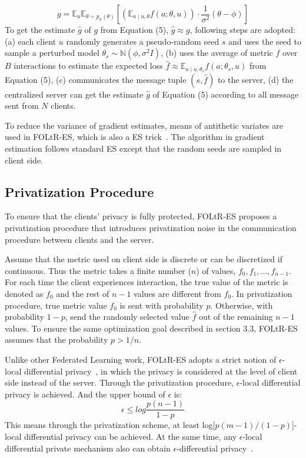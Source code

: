 \begin{equation}
	g=\mathbb{E}_{u} \mathbb{E}_{\theta \sim p_{\phi}(\theta)}\left[\left(\mathbb{E}_{a \mid u, \theta} f(a ; \theta, u)\right) \cdot \frac{1}{\sigma^{2}}(\theta-\phi)\right]
\end{equation}
To get the estimate $\hat{g}$ of $g$ from Equation (5), $\hat{g} \approx g$, following steps are adopted: (a) each client $u$ randomly generates a pseudo-random seed $s$ and uses the seed to sample a perturbed model $\theta_{s} \sim \mathbb{N}\left(\phi, \sigma^{2} I\right)$, (b) uses the average of metric $f$ over $B$ interactions to estimate the expected loss $\hat{f} \approx \mathbb{E}_{a \mid u, \theta_{s}} f(a;\theta_s, u) $ from Equation (5), (c) communicates the message tuple $(s,\hat{f})$ to the server, (d) the centralized server can get the estimate $\hat{g}$ of Equation (5) according to all message sent from $N$ clients.

To reduce the variance of gradient estimates, means of antithetic variates are used in FOLtR-ES, which is also a ES trick~\cite{salimans2017evolution}. The algorithm in gradient estimation follows standard ES except that the random seeds are sampled in client side.

\subsection{Privatization Procedure}
To ensure that the clients' privacy is fully protected, FOLtR-ES proposes a privatization procedure that introduces privatization noise in the communication procedure  between clients and the server.

Assume that the metric used on client side is discrete or can be discretized if continuous. Thus the metric takes a finite number ($n$) of values, $f_0, f_1, ..., f_{n-1}$. For each time the client experiences interaction, the true value of the metric is denoted as $f_0$ and the rest of $n-1$ values are different from $f_0$. In privatization procedure, true metric value $f_0$ is sent with probability $p$. Otherwise, with probability $1-p$, send the randomly selected value $\hat{f}$ out of the remaining $n-1$ values. To ensure the same optimization goal described in section 3.3, FOLtR-ES assumes that the probability $p > 1/n$.

Unlike other Federated Learning work, FOLtR-ES adopts a strict notion of $\epsilon$-local differential privacy~\cite{}, in which the privacy is considered at the level of client side instead of the server. Through the privatization procedure, $\epsilon$-local differential privacy is achieved. And the upper bound of $\epsilon$ is:
\begin{equation}
	\epsilon \leq log\frac{p(n-1)}{1-p} 
\end{equation}
This means through the privatization scheme, at least log[$p(m-1)/(1-p)$]-local differential privacy can be achieved. At the same time, any $\epsilon$-local differential private mechanism also can obtain $\epsilon$-differential privacy~\cite{}.